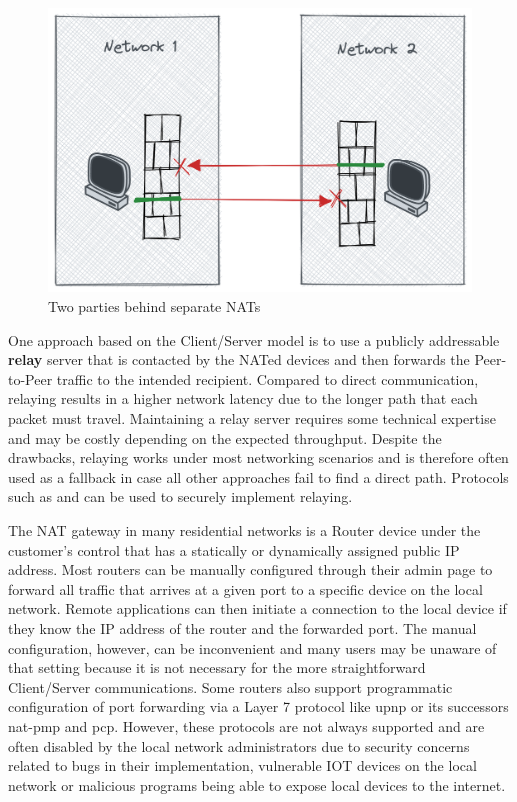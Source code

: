 \begin{figure}
\centering
\includegraphics[width=\textwidth,height=0.25\textheight]{thesis/../figures/nat-intro.png}
\caption{Two parties behind separate NATs\label{nat-intro}}
\end{figure}

One approach based on the Client/Server model is to use a publicly
addressable \textbf{relay} server that is contacted by the NATed devices
and then forwards the Peer-to-Peer traffic to the intended recipient.
Compared to direct communication, relaying results in a higher network
latency due to the longer path that each packet must travel. Maintaining
a relay server requires some technical expertise and may be costly
depending on the expected throughput. Despite the drawbacks, relaying
works under most networking scenarios and is therefore often used as a
fallback in case all other approaches fail to find a direct path.
Protocols such as  \autocite{turnRFC} and 
\autocite{derpDocs} can be used to securely implement relaying.

The NAT gateway in many residential networks is a Router device under
the customer's control that has a statically or dynamically assigned
public IP address. Most routers can be manually configured through their
admin page to forward all traffic that arrives at a given port to a
specific device on the local network. Remote applications can then
initiate a connection to the local device if they know the IP address of
the router and the forwarded port. The manual configuration, however,
can be inconvenient and many users may be unaware of that setting
because it is not necessary for the more straightforward Client/Server
communications. Some routers also support programmatic configuration of
port forwarding via a Layer 7 protocol like \gls{upnp} or its successors
\gls{nat-pmp} and \gls{pcp}. However, these protocols are not always
supported and are often disabled by the local network administrators due
to security concerns related to bugs in their implementation, vulnerable
IOT devices on the local network or malicious programs being able to
expose local devices to the internet.

